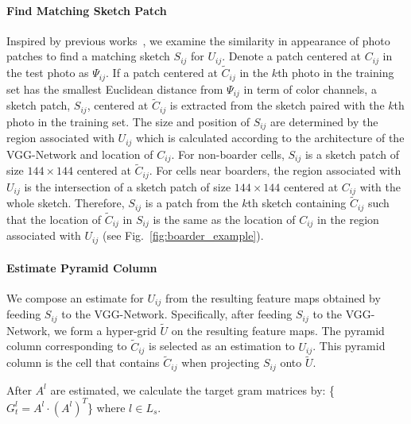\documentclass[10pt,twocolumn,letterpaper]{article}
\begin{document}
\paragraph{Find Matching Sketch Patch} Inspired by previous works~\cite{wang2009face,zhou2012markov}, we examine the similarity in appearance of photo patches to find a matching sketch $S_{ij}$ for $U_{ij}$. Denote a patch centered at $C_{ij}$ in the test photo as $\Psi_{ij}$. If a patch centered at $\tilde{C}_{ij}$ in the $k$th photo in the training set has the smallest Euclidean distance from $\Psi_{ij}$ in term of color channels, a sketch patch, $S_{ij}$, centered at $\tilde{C}_{ij}$ is extracted from the sketch paired with the $k$th photo in the training set. The size and position of $S_{ij}$ are determined by the region associated with $U_{ij}$ which is calculated according to the architecture of the VGG-Network and location of $C_{ij}$. For non-boarder cells, $S_{ij}$ is a sketch patch of size $144\times144$ centered at $\tilde{C}_{ij}$. For cells near boarders, the region associated with $U_{ij}$ is the intersection of a sketch patch of size $144\times144$ centered at $C_{ij}$ with the whole sketch. Therefore, $S_{ij}$ is a patch from the $k$th sketch containing $\tilde{C}_{ij}$ such that the location of $\tilde{C}_{ij}$ in $S_{ij}$ is the same as the location of $C_{ij}$ in the region associated with $U_{ij}$ (see Fig.~\ref{fig:boarder_example}).\\
\paragraph{Estimate Pyramid Column} We compose an estimate for $U_{ij}$ from the resulting feature maps obtained by feeding $S_{ij}$ to the VGG-Network. Specifically, after feeding $S_{ij}$ to the VGG-Network, we form a hyper-grid $\tilde{U}$ on the resulting feature maps. The pyramid column corresponding to $\tilde{C}_{ij}$ is selected as an estimation to $U_{ij}$. This pyramid column is the cell that contains $\tilde{C}_{ij}$ when projecting $S_{ij}$ onto $\tilde{U}$.\par
After $A^{l}$ are estimated, we calculate the target gram matrices by: \{$G_{t}^l =A^{l} \cdot {\left( {{A^{l}}} \right)^T}$\} where $l\in L_s$.
\end{document}
